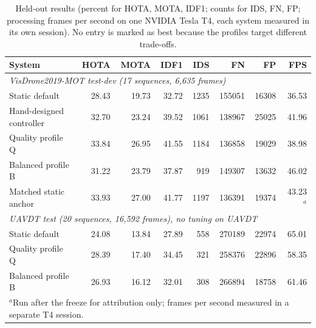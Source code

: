 \begin{table}[t]
\centering
\caption{Held-out results (percent for HOTA, MOTA, IDF1; counts for IDS, FN, FP; processing frames per second on one NVIDIA Tesla T4, each system measured in its own session). No entry is marked as best because the profiles target different trade-offs.}
\label{tab:main}
\small
\begin{tabular}{lrrrrrrr}
\hline
System & HOTA & MOTA & IDF1 & IDS & FN & FP & FPS \\
\hline
\multicolumn{8}{l}{\textit{VisDrone2019-MOT test-dev (17 sequences, 6,635 frames)}}\\
Static default & 28.43 & 19.73 & 32.72 & 1235 & 155051 & 16308 & 36.53 \\
Hand-designed controller & 32.70 & 23.24 & 39.52 & 1061 & 138967 & 25025 & 41.96 \\
Quality profile Q & 33.84 & 26.95 & 41.55 & 1184 & 136858 & 19029 & 38.98 \\
Balanced profile B & 31.22 & 23.79 & 37.87 & 919 & 149307 & 13632 & 46.02 \\
Matched static anchor & 33.93 & 27.00 & 41.77 & 1197 & 136391 & 19374 & 43.23$^{a}$ \\
\multicolumn{8}{l}{\textit{UAVDT test (20 sequences, 16,592 frames), no tuning on UAVDT}}\\
Static default & 24.08 & 13.84 & 27.89 & 558 & 270189 & 22974 & 65.01 \\
Quality profile Q & 28.39 & 17.40 & 34.45 & 321 & 258376 & 22896 & 58.35 \\
Balanced profile B & 26.93 & 16.12 & 32.01 & 308 & 266894 & 18758 & 61.46 \\
\hline
\multicolumn{8}{l}{$^{a}$Run after the freeze for attribution only; frames per second measured in a separate T4 session.}\\
\hline
\end{tabular}
\end{table}
